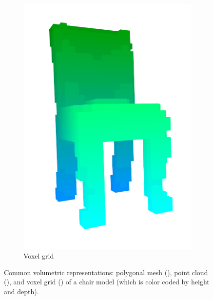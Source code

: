 \begin{figure}[!t]
\begin{subfigure}{0.2\linewidth}
		\includegraphics[width=\linewidth]{Figures/ObjRecog/chair_voxel}
		\caption{Voxel grid}
		\label{subfig:objrecog:3d_mesh_cloud_grid:grid}
	\end{subfigure}
	\hfill
	\caption{Common volumetric representations: polygonal mesh (), point cloud (), and voxel grid () of a chair model (which is color coded by height and depth).}
	\label{fig:objrecog:3d_mesh_cloud_grid}
\end{figure}

